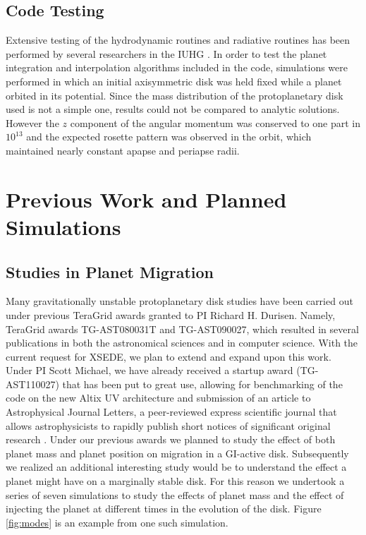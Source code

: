 \documentclass[12pt,preprint2]{aastex}
\begin{document}
\subsection{Code Testing}
\label{sec:tests}

Extensive testing of the hydrodynamic routines and radiative routines has been performed by several researchers in the
IUHG \citep{yangphd1992,pickettphd1995,pickett2000,pickett2003,mejia2005,boley2007b}. In order to test the planet
integration and interpolation algorithms included in the code, simulations were performed in which an initial
axisymmetric disk was held fixed while a planet orbited in its potential. Since the mass distribution of the
protoplanetary disk used is not a simple one, results could not be compared to analytic solutions. However the $z$
component of the angular momentum was conserved to one part in $10^{13}$ and the expected rosette pattern was observed
in the orbit, which maintained nearly constant apapse and periapse radii.

\section{Previous Work and Planned Simulations}
\label{sec:plan}

\subsection{Studies in Planet Migration} \label{sec:migplan}

Many gravitationally unstable protoplanetary disk studies have been carried out under previous TeraGrid awards granted
to PI Richard H. Durisen. Namely, TeraGrid awards TG-AST080031T and TG-AST090027, which resulted in several publications
\citep{henschel2010,michael2010a,michael2010b,michael2011a} in both the astronomical sciences and in computer
science. With the current request for XSEDE, we plan to extend and expand upon this work. Under PI Scott Michael, we
have already received a startup award (TG-AST110027) that has been put to great use, allowing for benchmarking of the
code on the new Altix UV architecture and submission of an article to Astrophysical Journal Letters, a peer-reviewed
express scientific journal that allows astrophysicists to rapidly publish short notices of significant original research
\citep{michael2011b}. Under our previous awards we planned to study the effect of both planet mass and planet position
on migration in a GI-active disk. Subsequently we realized an additional interesting study would be to understand the
effect a planet might have on a marginally stable disk. For this reason we undertook a series of seven simulations to
study the effects of planet mass and the effect of injecting the planet at different times in the evolution of the
disk. Figure \ref{fig:modes} is an example from one such simulation.
\end{document}
